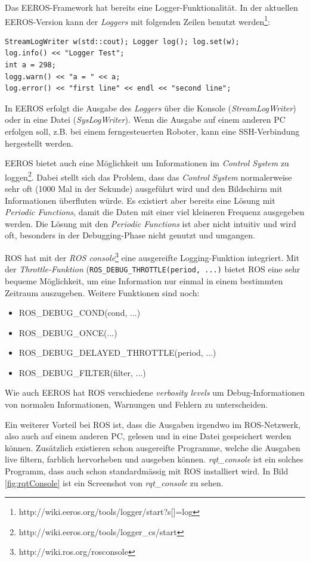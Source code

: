 Das EEROS-Framework hat bereits eine Logger-Funktionalität.
In der aktuellen EEROS-Version kann der \textit{Loggers}  mit folgenden Zeilen benutzt werden\footnote{http://wiki.eeros.org/tools/logger/start?s[]=log}:
\lstset{language=C++}
\begin{lstlisting}
StreamLogWriter w(std::cout); Logger log(); log.set(w);
log.info() << "Logger Test";
int a = 298;
logg.warn() << "a = " << a;
log.error() << "first line" << endl << "second line"; 
\end{lstlisting}

In EEROS erfolgt die Ausgabe des \textit{Loggers} über die Konsole (\textit{StreamLogWriter}) oder in eine Datei (\textit{SysLogWriter}).
Wenn die Ausgabe auf einem anderen PC erfolgen soll, z.B. bei einem ferngesteuerten Roboter, kann eine SSH-Verbindung hergestellt werden.

EEROS bietet auch eine Möglichkeit um Informationen im \textit{Control System} zu loggen\footnote{http://wiki.eeros.org/tools/logger\_cs/start}.
Dabei stellt sich das Problem, dass das \textit{Control System} normalerweise sehr oft (1000 Mal in der Sekunde) ausgeführt wird und den Bildschirm mit Informationen überfluten würde.
Es existiert aber bereits eine Lösung mit \textit{Periodic Functions}, damit die Daten mit einer viel kleineren Frequenz ausgegeben werden.
Die Lösung mit den \textit{Periodic Functions} ist aber nicht intuitiv und wird oft, besonders in der Debugging-Phase nicht genutzt und umgangen.

ROS hat mit der \textit{ROS console}\footnote{http://wiki.ros.org/rosconsole} eine ausgereifte Logging-Funktion integriert.
Mit der \textit{Throttle-Funktion} (\texttt{ROS\_DEBUG\_THROTTLE(period, ...)} bietet ROS eine sehr bequeme Möglichkeit, um eine Information nur einmal in einem bestimmten Zeitraum auszugeben.
Weitere Funktionen sind noch:

\begin{itemize}
\item ROS\_DEBUG\_COND(cond, ...)
\item ROS\_DEBUG\_ONCE(...)
\item ROS\_DEBUG\_DELAYED\_THROTTLE(period, ...)
\item ROS\_DEBUG\_FILTER(filter, ...)
\end{itemize}

Wie auch EEROS hat ROS verschiedene \textit{verbosity levels} um Debug-Informationen von normalen Informationen, Warnungen und Fehlern zu unterscheiden.

Ein weiterer Vorteil bei ROS ist, dass die Ausgaben irgendwo im ROS-Netzwerk, also auch auf einem anderen PC, gelesen und in eine Datei gespeichert werden können.
Zusätzlich existieren schon ausgereifte Programme, welche die Ausgaben live filtern, farblich hervorheben und ausgeben können.
\textit{rqt\_console} ist ein solches Programm, dass auch schon standardmässig mit ROS installiert wird.
In Bild \ref{fig:rqtConsole} ist ein Screenshot von \textit{rqt\_console} zu sehen.

